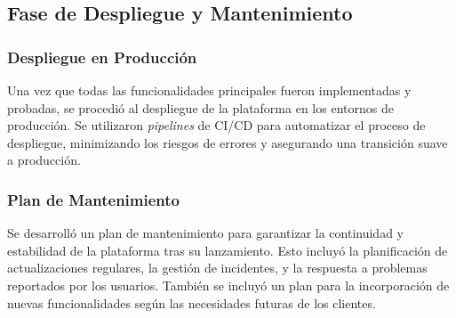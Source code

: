\subsection{Fase de Despliegue y Mantenimiento}
\subsubsection{Despliegue en Producción}
Una vez que todas las funcionalidades principales fueron implementadas y probadas, se procedió 
al despliegue de la plataforma en los entornos de producción. Se utilizaron \textit{pipelines} 
de CI/CD para automatizar el proceso de despliegue, minimizando los riesgos de errores y asegurando 
una transición suave a producción.

\subsubsection{Plan de Mantenimiento}
Se desarrolló un plan de mantenimiento para garantizar la continuidad y estabilidad de la 
plataforma tras su lanzamiento. Esto incluyó la planificación de actualizaciones regulares, 
la gestión de incidentes, y la respuesta a problemas reportados por los usuarios. También se 
incluyó un plan para la incorporación de nuevas funcionalidades según las necesidades futuras de los clientes.
